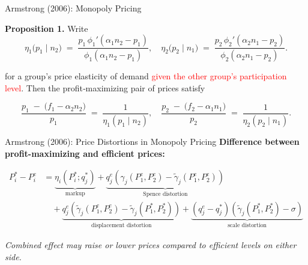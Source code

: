 \documentclass[aspectratio=169]{beamer}  %
\begin{document}
\begin{frame}{Armstrong (2006): Monopoly Pricing}
    \justifying  %
    
    \textbf{Proposition 1.} Write
    \[
      \eta_{1}\bigl(p_{1} \mid n_{2}\bigr) 
      \;=\; 
      \frac{p_{1}\,\phi_{1}'(\alpha_{1}n_{2} - p_{1})}{\phi_{1}(\alpha_{1}n_{2} - p_{1})},
      \quad
      \eta_{2}\bigl(p_{2} \mid n_{1}\bigr) 
      \;=\;
      \frac{p_{2}\,\phi_{2}'(\alpha_{2}n_{1} - p_{2})}{\phi_{2}(\alpha_{2}n_{1} - p_{2})}.
    \]
    
    for a group’s price elasticity of demand \textcolor{red}{given the other group’s participation level}.  
    Then the profit‐maximizing pair of prices satisfy
    
    \[
      \frac{p_{1} \;-\; \bigl(f_{1} - \alpha_{2}n_{2}\bigr)}{p_{1}}
      \;=\;
      \frac{1}{\eta_{1}(p_{1} \mid n_{2})},
      \quad
      \frac{p_{2} \;-\; \bigl(f_{2} - \alpha_{1}n_{1}\bigr)}{p_{2}}
      \;=\;
      \frac{1}{\eta_{2}(p_{2} \mid n_{1})}.
    \]
    
    \end{frame}

\begin{frame}{Armstrong (2006): Price Distortions in Monopoly Pricing}
        \large
        \textbf{Difference between profit-maximizing and efficient prices:}
        
        \vspace{0.5em}
        
        \begin{equation*}
        \begin{aligned}
        P_i^* - P_i^e &= \underbrace{\eta_i\left(P_i^*; q_j^*\right)}_{\text{markup}} 
        + \underbrace{q_j^e \left( \gamma_j(P_1^e, P_2^e) - \tilde{\gamma}_j(P_1^e, P_2^e) \right)}_{\text{Spence distortion}} \\
        &\quad + \underbrace{q_j^e \left( \tilde{\gamma}_j(P_1^e, P_2^e) - \tilde{\gamma}_j(P_1^*, P_2^*) \right)}_{\text{displacement distortion}} 
        + \underbrace{\left(q_j^e - q_j^*\right)\left( \tilde{\gamma}_j(P_1^*, P_2^*) - \sigma \right)}_{\text{scale distortion}}
        \end{aligned}
        \end{equation*}
        
        \vspace{0.5em}
        

        
        \textit{Combined effect may raise or lower prices compared to efficient levels on either side.}
\end{frame}
        
\end{document}
